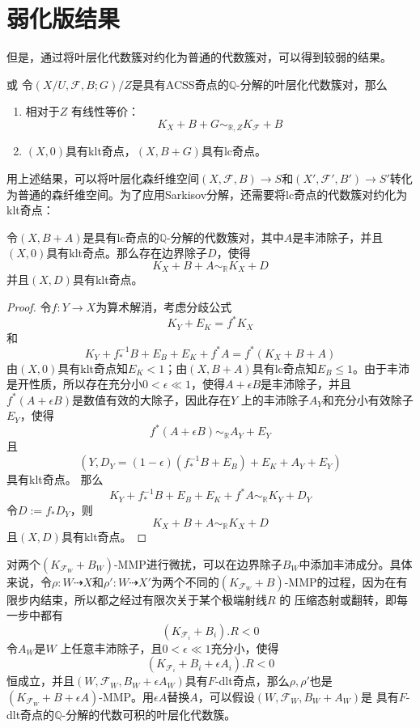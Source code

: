\section{弱化版结果}
但是，通过将叶层化代数簇对约化为普通的代数簇对，可以得到较弱的结果。
\begin{theorem}\cite[Proposition 3.6]{acss}或\cite[Proposition 7.3.6]{chlx}  
  令$(X/U,\mathcal{F},B;G)/Z$是具有ACSS奇点的$\mathbb{Q}$-分解的叶层化代数簇对，那么
  \begin{enumerate}
    \item 相对于$Z$ 有线性等价：
      \[ K_{X}+B+G\sim_{\mathbb{R},Z}K_{\mathcal{F}}+B \]
    \item $(X,0)$具有klt奇点，$(X,B+G)$具有lc奇点。
  \end{enumerate}
\end{theorem}
用上述结果，可以将叶层化森纤维空间$(X,\mathcal{F},B)\to S$和$(X',\mathcal{F}',B')\to S' $转化为普通的森纤维空间。为了应用Sarkisov分解，还需要将lc奇点的代数簇对约化为klt奇点：
\begin{lemma}\label{lctoklt}
 令$(X,B+A)$是具有lc奇点的$\mathbb{Q}$-分解的代数簇对，其中$A$是丰沛除子，并且$(X,0)$具有klt奇点。那么存在边界除子$D$，使得
 \[ K_{X}+B+A\sim_{\mathbb{R}}K_{X}+D \]
 并且$(X,D)$具有klt奇点。
\end{lemma}
\begin{proof}
  令$f:Y\to X$为算术解消，考虑分歧公式
  \[ K_{Y}+E_{K}=f^{*}K_{X} \]
  和
  \[ K_{Y}+f^{-1}_{*}B+E_{B}+E_{K}+f^{*}A=f^{*}(K_{X}+B+A) \]
  由$(X,0)$具有klt奇点知$E_{K}< 1 $；由$(X,B+A)$具有lc奇点知$E_{B}\leqslant 1$。由于丰沛是开性质，所以存在充分小$0< \epsilon \ll 1$，使得$A+\epsilon B$是丰沛除子，并且$f^{*}(A+\epsilon B)$是数值有效的大除子，因此存在$Y$ 上的丰沛除子$A_{Y}$和充分小有效除子$E_{Y}$，使得
  \[ f^{*}(A+\epsilon B)\sim_{\mathbb{R}} A_{Y}+E_{Y} \]
  且
  \[ \left(Y,D_{Y}=(1-\epsilon)(f^{-1}_{*}B+E_{B})+E_{K}+A_{Y}+E_{Y}\right) \]
  具有klt奇点。 那么
  \[ K_{Y}+f^{-1}_{*}B+E_{B}+E_{K}+f^{*}A\sim_{\mathbb{R}} K_{Y}+D_{Y} \]
  令$D:=f_{*}D_{Y}$，则
  \[ K_{X}+B+A\sim_{\mathbb{R}} K_{X}+D \]
  且$(X,D)$具有klt奇点。
\end{proof}
对两个$(K_{\mathcal{F}_{W}}+B_{W})$-MMP进行微扰，可以在边界除子$B_{W}$中添加丰沛成分。具体来说，令$\rho:W \dashrightarrow X$和$\rho': W \dashrightarrow X'$为两个不同的$(K_{\mathcal{F}_{W}}+B)$-MMP的过程，因为在有限步内结束，所以都之经过有限次关于某个极端射线$R$ 的 压缩态射或翻转，即每一步中都有
\[ (K_{\mathcal{F}_{i}}+B_{i}).R<0 \]
令$A_{W}$是$W$ 上任意丰沛除子，且$0<\epsilon\ll 1$充分小，使得
\[ (K_{\mathcal{F}_{i}}+B_{i}+\epsilon A_{i}).R<0 \]
恒成立，并且$(W,\mathcal{F}_{W},B_{W}+\epsilon A_{W})$具有$F$-dlt奇点，那么$\rho,\rho'$也是$(K_{\mathcal{F}_{W}}+B+\epsilon A)$-MMP。用$\epsilon A$替换$A$，可以假设$(W,\mathcal{F}_{W},B_{W}+A_{W})$是 具有$F$-dlt奇点的$\mathbb{Q}$-分解的代数可积的叶层化代数簇。 

